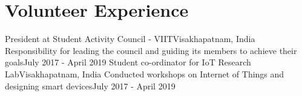 \section{Volunteer Experience}
  \resumeSubHeadingListStart
	\resumeSubheading
    {President at Student Activity Council - VIIT}{Visakhapatnam, India}
    {Responsibility for leading the council and guiding its members to achieve their goals}{July 2017 - April 2019}
\vspace{5pt}
    \resumeSubheading
    {Student co-ordinator for IoT Research Lab}{Visakhapatnam, India}
    {Conducted workshops on Internet of Things and designing smart devices}{July 2017 - April 2019}

\resumeSubHeadingListEnd